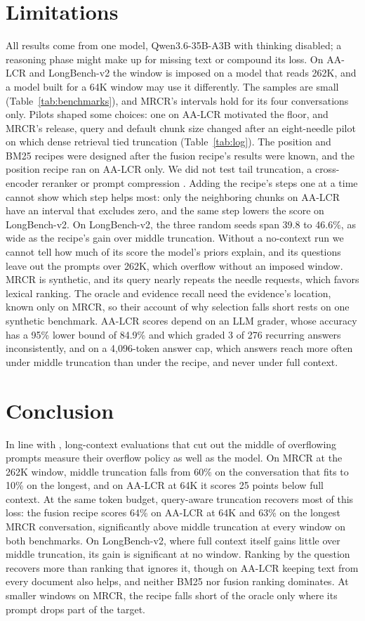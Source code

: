 \documentclass[letterpaper]{article} %
\newcommand{\recipe}{fusion recipe}
\begin{document}
\section{Limitations}
All results come from one model, Qwen3.6-35B-A3B with thinking disabled; a reasoning phase might make up for missing text or compound its loss. On AA-LCR and LongBench-v2 the window is imposed on a model that reads 262K, and a model built for a 64K window may use it differently. The samples are small (Table~\ref{tab:benchmarks}), and MRCR's intervals hold for its four conversations only. Pilots shaped some choices: one on AA-LCR motivated the floor, and MRCR's release, query and default chunk size changed after an eight-needle pilot on which dense retrieval tied truncation (Table~\ref{tab:log}). The position and BM25 recipes were designed after the \recipe's results were known, and the position recipe ran on AA-LCR only. We did not test tail truncation, a cross-encoder reranker or prompt compression \cite{jiang2024longllmlingua}. Adding the recipe's steps one at a time cannot show which step helps most: only the neighboring chunks on AA-LCR have an interval that excludes zero, and the same step lowers the score on LongBench-v2. On LongBench-v2, the three random seeds span 39.8 to 46.6\%, as wide as the recipe's gain over middle truncation. Without a no-context run we cannot tell how much of its score the model's priors explain, and its questions leave out the prompts over 262K, which overflow without an imposed window. MRCR is synthetic, and its query nearly repeats the needle requests, which favors lexical ranking. The oracle and evidence recall need the evidence's location, known only on MRCR, so their account of why selection falls short rests on one synthetic benchmark. AA-LCR scores depend on an LLM grader, whose accuracy has a 95\% lower bound of 84.9\% and which graded 3 of 276 recurring answers inconsistently, and on a 4,096-token answer cap, which answers reach more often under middle truncation than under the recipe, and never under full context.

\section{Conclusion}
In line with \citet{arjmandi2026distractor}, long-context evaluations that cut out the middle of overflowing prompts measure their overflow policy as well as the model. On MRCR at the 262K window, middle truncation falls from 60\% on the conversation that fits to 10\% on the longest, and on AA-LCR at 64K it scores 25 points below full context. At the same token budget, query-aware truncation recovers most of this loss: the \recipe{} scores 64\% on AA-LCR at 64K and 63\% on the longest MRCR conversation, significantly above middle truncation at every window on both benchmarks. On LongBench-v2, where full context itself gains little over middle truncation, its gain is significant at no window. Ranking by the question recovers more than ranking that ignores it, though on AA-LCR keeping text from every document also helps, and neither BM25 nor fusion ranking dominates. At smaller windows on MRCR, the recipe falls short of the oracle only where its prompt drops part of the target.
\end{document}
